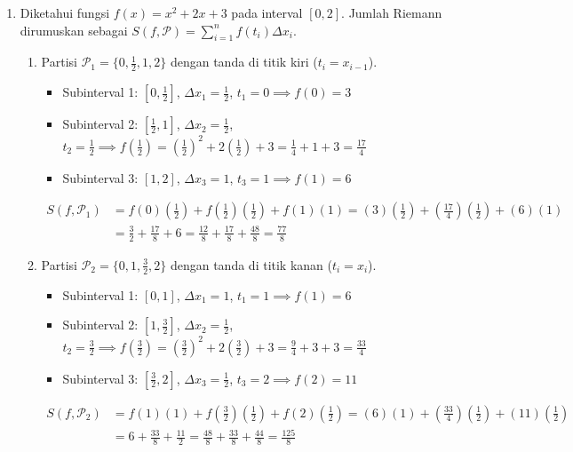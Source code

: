 \documentclass[11pt,letterpaper]{article}
\begin{document}
\begin{enumerate}
  \item Diketahui fungsi $f(x) = x^2 + 2x + 3$ pada interval $[0,2]$. Jumlah Riemann dirumuskan sebagai $S(f, \mathcal{P}) = \sum_{i=1}^{n} f(t_i) \Delta x_i$.
        \begin{enumerate}[label=\alph*)]
          \item Partisi $\mathcal{P}_1 = \{0, \frac{1}{2}, 1, 2\}$ dengan tanda di titik kiri ($t_i = x_{i-1}$).
                \begin{itemize}
                  \item Subinterval 1: $[0, \frac{1}{2}]$, $\Delta x_1 = \frac{1}{2}$, $t_1 = 0 \implies f(0) = 3$
                  \item Subinterval 2: $[\frac{1}{2}, 1]$, $\Delta x_2 = \frac{1}{2}$, $t_2 = \frac{1}{2} \implies f\left(\frac{1}{2}\right) = \left(\frac{1}{2}\right)^2 + 2\left(\frac{1}{2}\right) + 3 = \frac{1}{4} + 1 + 3 = \frac{17}{4}$
                  \item Subinterval 3: $[1, 2]$, $\Delta x_3 = 1$, $t_3 = 1 \implies f(1) = 6$
                \end{itemize}
                \begin{align*}
                  S(f, \mathcal{P}_1) & = f(0)\left(\frac{1}{2}\right) + f\left(\frac{1}{2}\right)\left(\frac{1}{2}\right) + f(1)(1) = (3)\left(\frac{1}{2}\right) + \left(\frac{17}{4}\right)\left(\frac{1}{2}\right) + (6)(1) \\
                                      & = \frac{3}{2} + \frac{17}{8} + 6  = \frac{12}{8} + \frac{17}{8} + \frac{48}{8} = \frac{77}{8}
                \end{align*}
          \item Partisi $\mathcal{P}_2 = \{0, 1, \frac{3}{2}, 2\}$ dengan tanda di titik kanan ($t_i = x_i$).
                \begin{itemize}
                  \item Subinterval 1: $[0, 1]$, $\Delta x_1 = 1$, $t_1 = 1 \implies f(1) = 6$
                  \item Subinterval 2: $[1, \frac{3}{2}]$, $\Delta x_2 = \frac{1}{2}$, $t_2 = \frac{3}{2} \implies f\left(\frac{3}{2}\right) = \left(\frac{3}{2}\right)^2 + 2\left(\frac{3}{2}\right) + 3 = \frac{9}{4} + 3 + 3 = \frac{33}{4}$
                  \item Subinterval 3: $[\frac{3}{2}, 2]$, $\Delta x_3 = \frac{1}{2}$, $t_3 = 2 \implies f(2) = 11$
                \end{itemize}
                \begin{align*}
                  S(f, \mathcal{P}_2) & = f(1)(1) + f\left(\frac{3}{2}\right)\left(\frac{1}{2}\right) + f(2)\left(\frac{1}{2}\right) = (6)(1) + \left(\frac{33}{4}\right)\left(\frac{1}{2}\right) + (11)\left(\frac{1}{2}\right) \\
                                      & = 6 + \frac{33}{8} + \frac{11}{2} = \frac{48}{8} + \frac{33}{8} + \frac{44}{8} = \frac{125}{8}
                \end{align*}


\end{enumerate}
\end{enumerate}
\end{document}
